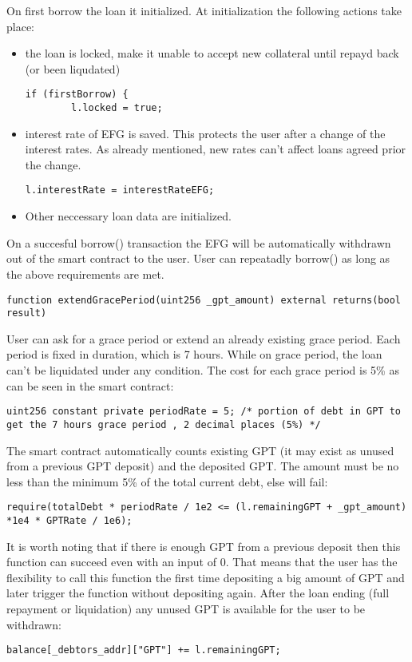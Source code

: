 \documentclass{article}
\begin{document}
On first borrow the loan it initialized. At initialization the following actions take place:
\begin{itemize}
\item the loan is locked, make it unable to accept new collateral until repayd back (or been liqudated)
\begin{lstlisting}[language=Solidity,numbers=none,escapechar=@]
 if (firstBorrow) {
	    l.locked = true;
\end{lstlisting}
\item interest rate of EFG is saved. This protects the user after a change of the interest rates. As already mentioned, new rates can't affect loans agreed prior the change.
\begin{lstlisting}[language=Solidity,numbers=none,escapechar=@]
  l.interestRate = interestRateEFG;
\end{lstlisting}
\item Other neccessary loan data are initialized.
\end{itemize}
On a succesful borrow() transaction the EFG will be automatically withdrawn out of the smart contract to the user. User can repeatadly borrow() as long as the above requirements are met.
\\
\begin{lstlisting}[language=Solidity,numbers=none,escapechar=@]
function extendGracePeriod(uint256 _gpt_amount) external returns(bool result)
\end{lstlisting}
User can ask for a grace period or extend an already existing grace period. Each period is fixed in duration, which is 7 hours. While on grace period, the loan can't be liquidated under any condition. The cost for each grace period is 5\% as can be seen in the smart contract:
\\
\begin{lstlisting}[language=Solidity,numbers=none,escapechar=@]
uint256 constant private periodRate = 5; /* portion of debt in GPT to get the 7 hours grace period , 2 decimal places (5%) */
\end{lstlisting}
The smart contract automatically counts existing GPT (it may exist as unused from a previous GPT deposit) and the deposited GPT. The amount must be no less than the minimum 5\% of the total current debt, else will fail:
\\
\begin{lstlisting}[language=Solidity,numbers=none,escapechar=@]
 require(totalDebt * periodRate / 1e2 <= (l.remainingGPT + _gpt_amount) *1e4 * GPTRate / 1e6); 
\end{lstlisting}
It is worth noting that if there is enough GPT from a previous deposit then this function can succeed even with an input of 0. That means that the user has the flexibility to call this function the first time depositing a big amount of GPT and later trigger the function without depositing again. After the loan ending (full repayment or liquidation) any unused GPT is available for the user to be withdrawn:
\\
\begin{lstlisting}[language=Solidity,numbers=none,escapechar=@]
	balance[_debtors_addr]["GPT"] += l.remainingGPT;
\end{lstlisting}
\end{document}
